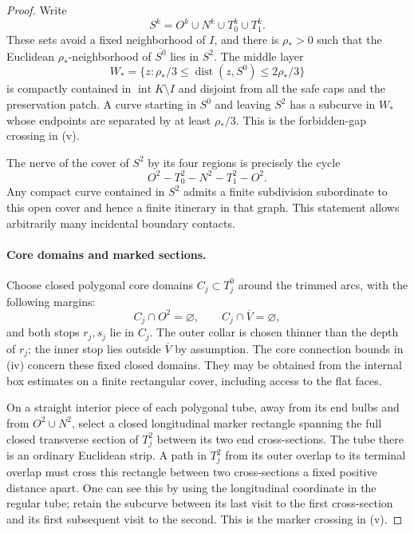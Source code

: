 \begin{proof}
Write
\[
 S^k=O^k\cup N^k\cup T_0^k\cup T_1^k.
\]
These sets avoid a fixed neighborhood of $I$, and there is
$\rho_*>0$
such that the Euclidean $\rho_*$-neighborhood of
$\overline{S^0}$ lies in $S^2$.
The middle layer
\[
 W_*=
 \{z:\rho_*/3\le\operatorname{dist}(z,S^0)
                         \le2\rho_*/3\}
\]
is compactly contained in
$\operatorname{int}K\setminus I$ and disjoint from all
the safe caps and the preservation patch.  A curve starting
in $S^0$ and leaving $S^2$ has a subcurve in $W_*$ whose
endpoints are separated by at least $\rho_*/3$.
This is the forbidden-gap crossing in (v).

The nerve of the cover of $S^2$ by its four regions is
precisely the cycle
\[
 O^2-T_0^2-N^2-T_1^2-O^2.
\]
Any compact curve contained in $S^2$ admits a finite
subdivision subordinate to this open cover and hence a
finite itinerary in that graph.  This statement allows
arbitrarily many incidental boundary contacts.

\paragraph{Core domains and marked sections.}
Choose closed polygonal core domains $C_j\subset T_j^0$
around the trimmed arcs, with the following margins:
\[
 C_j\cap O^2=\varnothing,\qquad
 C_j\cap\overline V=\varnothing,
\]
and both stops $r_j,s_j$ lie in $C_j$.
The outer collar is chosen thinner than the depth of $r_j$;
the inner stop lies outside $\overline V$ by assumption.
The core connection bounds in (iv) concern these fixed
closed domains.  They may be obtained from the internal
box estimates on a finite rectangular cover, including
access to the flat faces.

On a straight interior piece of each polygonal tube, away
from its end bulbs and from $O^2\cup N^2$, select a closed
longitudinal marker rectangle spanning the full closed transverse
section of $T_j^2$ between its two end cross-sections.
The tube there is an
ordinary Euclidean strip.  A path in $T_j^2$ from its outer
overlap to its terminal overlap must cross this rectangle
between two cross-sections a fixed positive distance apart.
One can see this by using the longitudinal coordinate in
the regular tube; retain the subcurve between its last
visit to the first cross-section and its first subsequent
visit to the second.  This is the marker crossing in (v).


\end{proof}
